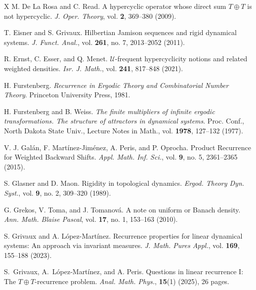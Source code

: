 \documentclass[openright,11pt]{article}
\theoremstyle{plain}
\theoremstyle{definition}
\newcommand{\Uc}{\mathcal{U}}
\begin{document}
{\begin{thebibliography}{X}
	 M. De La Rosa and C. Read. A hypercyclic operator whose direct sum $T\oplus T$ is not hypercyclic. \textit{J. Oper. Theory}, vol. \textbf{2}, 369--380 (2009).%
	
	 T. Eisner and S. Grivaux. Hilbertian Jamison sequences and rigid dynamical systems. \textit{J. Funct. Anal.}, vol. \textbf{261}, no. 7, 2013--2052 (2011).%
	
	 R. Ernst, C. Esser, and Q. Menet. $\Uc$-frequent hypercyclicity notions and related weighted densities. \textit{Isr. J. Math.}, vol. \textbf{241}, 817--848 (2021).%
	
	 H. Furstenberg. \textit{Recurrence in Ergodic Theory and Combinatorial Number Theory}. Princeton University Press, 1981.%
	
	 H. Furstenberg and B. Weiss. \textit{The finite multipliers of infinite ergodic transformations. The structure of attractors in dynamical systems}. Proc. Conf., North Dakota State Univ., Lecture Notes in Math., vol. \textbf{1978}, 127--132 (1977).%
	
	 V. J. Gal\'an, F. Mart\'inez-Jim\'enez, A. Peris, and P. Oprocha. Product Recurrence for Weighted Backward Shifts. \textit{Appl. Math. Inf. Sci.}, vol. \textbf{9}, no. 5, 2361--2365 (2015).%
	
	 S. Glasner and D. Maon. Rigidity in topological dynamics. \textit{Ergod. Theory Dyn. Syst.}, vol. \textbf{9}, no. 2, 309--320 (1989).%

	 G. Grekos, V. Toma, and J. Tomanov\'a. A note on uniform or Banach density. \textit{Ann. Math. Blaise Pascal}, vol. \textbf{17}, no. 1, 153--163 (2010).%
	
	 S. Grivaux and A. L\'opez-Mart\'inez. Recurrence properties for linear dynamical systems: An approach via invariant measures. \textit{J. Math. Pures Appl.}, vol. \textbf{169}, 155--188 (2023).%

	 S.~Grivaux, A.~L\'opez-Mart\'inez, and A. Peris. Questions in linear recurrence I: The $T\oplus T$-recurrence problem. \textit{Anal. Math. Phys.}, \textbf{15}(1) (2025), 26 pages.%


\end{thebibliography}}
\end{document}
